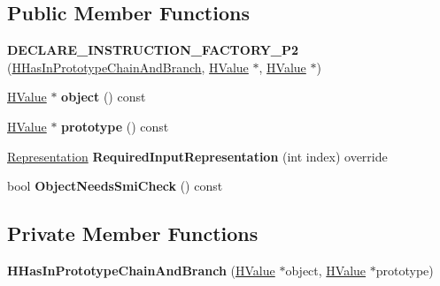 \subsection*{Public Member Functions}
\begin{DoxyCompactItemize}
\item 
{\bfseries D\+E\+C\+L\+A\+R\+E\+\_\+\+I\+N\+S\+T\+R\+U\+C\+T\+I\+O\+N\+\_\+\+F\+A\+C\+T\+O\+R\+Y\+\_\+\+P2} (\hyperlink{classv8_1_1internal_1_1_h_has_in_prototype_chain_and_branch}{H\+Has\+In\+Prototype\+Chain\+And\+Branch}, \hyperlink{classv8_1_1internal_1_1_h_value}{H\+Value} $\ast$, \hyperlink{classv8_1_1internal_1_1_h_value}{H\+Value} $\ast$)\hypertarget{classv8_1_1internal_1_1_h_has_in_prototype_chain_and_branch_a3e5cd4c0cd19ef07ef151b58109f4aa1}{}\label{classv8_1_1internal_1_1_h_has_in_prototype_chain_and_branch_a3e5cd4c0cd19ef07ef151b58109f4aa1}

\item 
\hyperlink{classv8_1_1internal_1_1_h_value}{H\+Value} $\ast$ {\bfseries object} () const \hypertarget{classv8_1_1internal_1_1_h_has_in_prototype_chain_and_branch_aa151b38a588275859b43c111495fa0de}{}\label{classv8_1_1internal_1_1_h_has_in_prototype_chain_and_branch_aa151b38a588275859b43c111495fa0de}

\item 
\hyperlink{classv8_1_1internal_1_1_h_value}{H\+Value} $\ast$ {\bfseries prototype} () const \hypertarget{classv8_1_1internal_1_1_h_has_in_prototype_chain_and_branch_a3efe68fff960296dfe424495869f520b}{}\label{classv8_1_1internal_1_1_h_has_in_prototype_chain_and_branch_a3efe68fff960296dfe424495869f520b}

\item 
\hyperlink{classv8_1_1internal_1_1_representation}{Representation} {\bfseries Required\+Input\+Representation} (int index) override\hypertarget{classv8_1_1internal_1_1_h_has_in_prototype_chain_and_branch_a866a698c0a68a50b691d8bb2729d30d6}{}\label{classv8_1_1internal_1_1_h_has_in_prototype_chain_and_branch_a866a698c0a68a50b691d8bb2729d30d6}

\item 
bool {\bfseries Object\+Needs\+Smi\+Check} () const \hypertarget{classv8_1_1internal_1_1_h_has_in_prototype_chain_and_branch_a4273b5e960925be57ec6db452a9e8813}{}\label{classv8_1_1internal_1_1_h_has_in_prototype_chain_and_branch_a4273b5e960925be57ec6db452a9e8813}

\end{DoxyCompactItemize}
\subsection*{Private Member Functions}
\begin{DoxyCompactItemize}
\item 
{\bfseries H\+Has\+In\+Prototype\+Chain\+And\+Branch} (\hyperlink{classv8_1_1internal_1_1_h_value}{H\+Value} $\ast$object, \hyperlink{classv8_1_1internal_1_1_h_value}{H\+Value} $\ast$prototype)\hypertarget{classv8_1_1internal_1_1_h_has_in_prototype_chain_and_branch_a91849d61b083c6b7c508fbcfc7597d58}{}\label{classv8_1_1internal_1_1_h_has_in_prototype_chain_and_branch_a91849d61b083c6b7c508fbcfc7597d58}

\end{DoxyCompactItemize}
